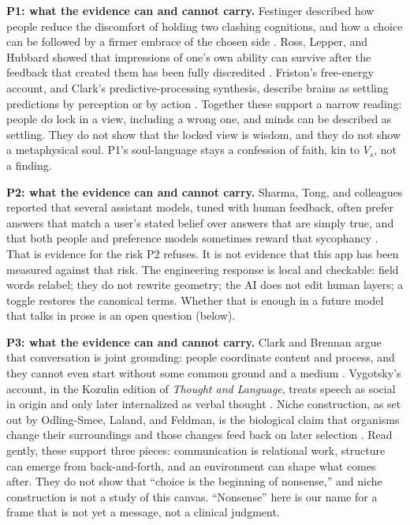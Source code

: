 \documentclass[11pt]{article}
\begin{document}
\textbf{P1: what the evidence can and cannot carry.}
Festinger described how people reduce the discomfort of holding two clashing cognitions, and how a choice can be followed by a firmer embrace of the chosen side \cite{festinger}. Ross, Lepper, and Hubbard showed that impressions of one's own ability can survive after the feedback that created them has been fully discredited \cite{ross}. Friston's free-energy account, and Clark's predictive-processing synthesis, describe brains as settling predictions by perception or by action \cite{friston,clark2016}. Together these support a narrow reading: people do lock in a view, including a wrong one, and minds can be described as settling. They do not show that the locked view is wisdom, and they do not show a metaphysical soul. P1's soul-language stays a confession of faith, kin to $V_s$, not a finding.

\textbf{P2: what the evidence can and cannot carry.}
Sharma, Tong, and colleagues reported that several assistant models, tuned with human feedback, often prefer answers that match a user's stated belief over answers that are simply true, and that both people and preference models sometimes reward that sycophancy \cite{sharma}. That is evidence for the risk P2 refuses. It is not evidence that this app has been measured against that risk. The engineering response is local and checkable: field words relabel; they do not rewrite geometry; the AI does not edit human layers; a toggle restores the canonical terms. Whether that is enough in a future model that talks in prose is an open question (below).

\textbf{P3: what the evidence can and cannot carry.}
Clark and Brennan argue that conversation is joint grounding: people coordinate content and process, and they cannot even start without some common ground and a medium \cite{clarkbrennan}. Vygotsky's account, in the Kozulin edition of \emph{Thought and Language}, treats speech as social in origin and only later internalized as verbal thought \cite{vygotsky}. Niche construction, as set out by Odling-Smee, Laland, and Feldman, is the biological claim that organisms change their surroundings and those changes feed back on later selection \cite{niche}. Read gently, these support three pieces: communication is relational work, structure can emerge from back-and-forth, and an environment can shape what comes after. They do not show that ``choice is the beginning of nonsense,'' and niche construction is not a study of this canvas. ``Nonsense'' here is our name for a frame that is not yet a message, not a clinical judgment.
\end{document}
